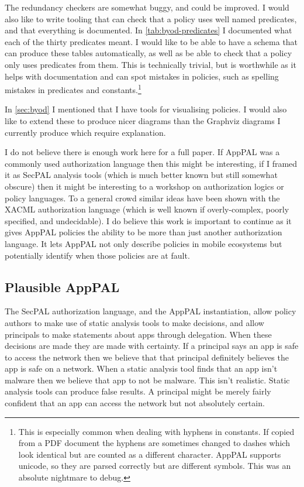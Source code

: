 \documentclass[a4paper]{scrartcl}
\begin{document}
The redundancy checkers are somewhat buggy, and could be improved.
I would also like to write tooling that can check that a policy uses well named
predicates, and that everything is documented.  In \autoref{tab:byod-predicates}
I documented what each of the thirty predicates meant.  I would like to be able
to have a schema that can produce these tables automatically, as well as be able to
check that a policy only uses predicates from them.  This is technically
trivial, but is worthwhile as it helps with documentation and can spot mistakes
in policies, such as spelling mistakes in predicates and constants.\footnote{This is
  especially common when dealing with hyphens in constants.  If copied from a
  PDF document the hyphens are sometimes changed to dashes which look identical
  but are counted as a different character.  AppPAL supports unicode, so they
  are parsed correctly but are different symbols.  This was an absolute
  nightmare to debug.}

In \autoref{sec:byod} I mentioned that I have tools for visualising policies.  I
would also like to extend these to produce nicer diagrams than the Graphviz
diagrams I currently produce which require explanation.

I do not believe there is enough work here for a full paper.  If AppPAL was a
commonly used authorization language then this might be interesting, if I framed
it as SecPAL analysis tools (which is much better known but still somewhat
obscure) then it might be interesting to a workshop on authorization logics or
policy languages.   To a general crowd similar ideas have been shown with the
XACML authorization language (which is well known if overly-complex, poorly
specified, and undecidable).  I do believe this work is important to continue as
it gives AppPAL policies the ability to be more than just another authorization
language. It lets AppPAL not only describe policies in mobile ecosystems but
potentially identify when those policies are at fault.

\subsection{Plausible AppPAL}
\label{sec:plausible}

The SecPAL authorization language, and the AppPAL instantiation, allow policy
authors to make use of static analysis tools to make decisions, and allow
principals to make statements about apps through delegation. When these
decisions are made they are made with certainty. If a principal says an app is
safe to access the network then we believe that that principal definitely
believes the app is safe on a network. When a static analysis tool finds that an
app isn't malware then we believe that app to not be malware. This isn't
realistic. Static analysis tools can produce false results. A principal might be
merely fairly confident that an app can access the network but not absolutely
certain.
\end{document}
